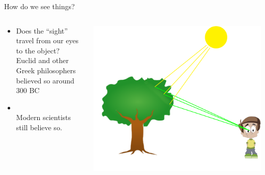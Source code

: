 \begin{frame}{How do we see things?}
  \begin{columns}
    \begin{column}{0.7\textwidth}
      \begin{itemize}
        \item
          Does the ``sight'' travel from our eyes to the object?\\
           {\color{red}Euclid and other Greek philosophers believed so around 300 BC}
       \item
         \color{black}{or the ``light'' travels from the object to our eyes?}\\
          {\color{red}Modern scientists still believe so.}
      \end{itemize}
    \end{column}
    \hspace{-2cm}
    \begin{column}{0.3\textwidth}
      \centering
        \includegraphics[width=1.4\textwidth]{media/suntreeboy.pdf}
    \end{column}
  \end{columns}
\end{frame}

